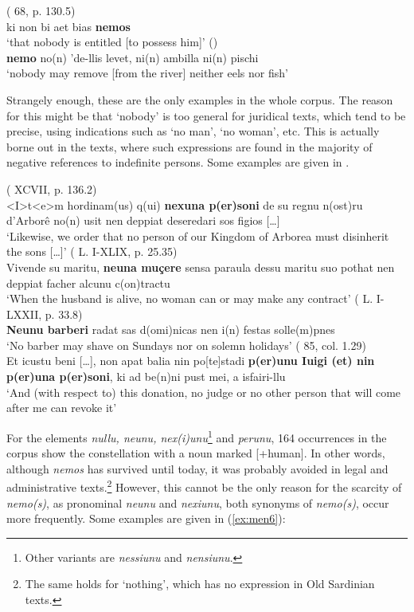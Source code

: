 \documentclass[output=paper,colorlinks,citecolor=brown]{langscibook}
\begin{document}
\ea\label{ex:men4}
    \ea\label{ex:men4a}( 68, p. 130.5)\\
         ki non bi aet bias \textbf{nemos}\\
        ‘that nobody is entitled [to possess him]’
    \ex\label{ex:men4b}()\\
        \textbf{nemo} no(n) 'de-llis levet, ni(n) ambilla ni(n) pischi\\
        ‘nobody may remove [from the river] neither eels nor fish’        
    \z
\z

Strangely enough, these are the only examples in the whole corpus. The reason for this might be that ‘nobody’ is too general for juridical texts, which tend to be precise, using indications such as ‘no man’, ‘no woman’, etc. This is actually borne out in the texts, where such expressions are found in the majority of negative references to indefinite persons. Some examples are given in .\largerpage[2]

\ea\label{ex:men5}
        \ea\label{ex:men5a}( XCVII, p. 136.2)\\
         <I>t<e>m hordinam(us) q(ui) \textbf{nexuna p(er)soni} de su regnu n(ost)ru d'Arborê no(n) usit nen deppiat deseredari sos figios […]\\
        ‘Likewise, we order that no person of our Kingdom of Arborea must disinherit the sons […]’
        \ex\label{ex:men5b}(  L. I-XLIX, p. 25.35)\\
         Vivende su maritu, \textbf{neuna muçere} sensa paraula dessu maritu suo pothat nen deppiat facher alcunu c(on)tractu\\
        ‘When the husband is alive, no woman can or may make any contract’
        \ex\label{ex:men5c}( L. I-LXXII, p. 33.8)\\
         \textbf{Neunu barberi} radat sas d(omi)nicas nen i(n) festas solle(m)pnes\\
        ‘No barber may shave on Sundays nor on solemn holidays’
        \ex\label{ex:men5d}( 85, col. 1.29) \\
         Et icustu beni […], non apat balia nin po[te]stadi \textbf{p(er)unu Iuigi (et) nin p(er)una p(er)soni}, ki ad be(n)ni pust mei, a isfairi-llu\\
        ‘And (with respect to) this donation, no judge or no other person that will come after me can revoke it’
    \z
\z

For the elements \textit{nullu, neunu, nex(i)unu}\footnote{Other variants are \textit{nessiunu} and \textit{nensiunu}.}  and \textit{perunu}, 164 occurrences in the corpus show the constellation with a noun marked [+human]. In other words, although \textit{nemos} has survived until today, it was probably avoided in legal and administrative texts.\footnote{The same holds for ‘nothing’, which has no expression in Old Sardinian texts.}  However, this cannot be the only reason for the scarcity of \textit{nemo(s)}, as pronominal \textit{neunu} and \textit{nexiunu}, both synonyms of \textit{nemo(s)}, occur more frequently. Some examples are given in (\ref{ex:men6}):
\end{document}
